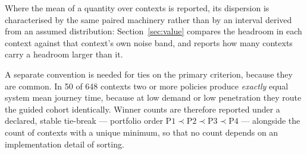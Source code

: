 Where the mean of a quantity over contexts is reported, its dispersion is
characterised by the same paired machinery rather than by an interval derived
from an assumed distribution: Section~\ref{sec:value} compares the headroom in
each context against that context's own noise band, and reports how many
contexts carry a headroom larger than it.

A separate convention is needed for ties on the primary criterion, because they
are common. In 50 of 648 contexts two or more policies produce \emph{exactly}
equal system mean journey time, because at low demand or low penetration they
route the guided cohort identically. Winner counts are therefore reported under
a declared, stable tie-break --- portfolio order $\mathrm{P1} \prec \mathrm{P2}
\prec \mathrm{P3} \prec \mathrm{P4}$ --- alongside the count of contexts with a
unique minimum, so that no count depends on an implementation detail of sorting.

